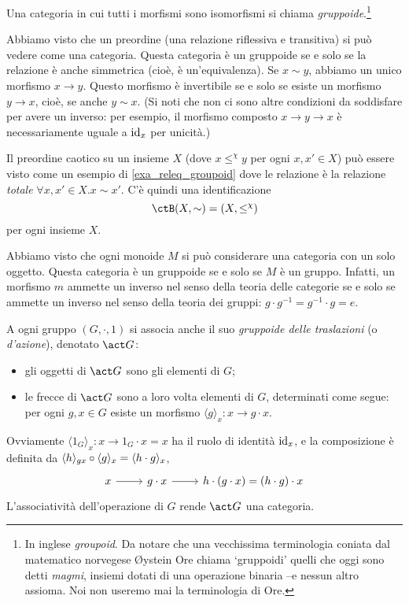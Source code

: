 \begin{definition}[Gruppoide]\label{def_gruppoide}
	Una categoria in cui tutti i morfismi sono isomorfismi si chiama \emph{gruppoide}.\footnote{In inglese \emph{groupoid}. Da notare che una vecchissima terminologia coniata dal matematico norvegese Øystein Ore chiama `gruppoidi' quelli che oggi sono detti \emph{magmi}, insiemi dotati di una operazione binaria --e nessun altro assioma. Noi non useremo mai la terminologia di Ore.}
\end{definition}
\begin{example}\label{exa_releq_groupoid}
	Abbiamo visto che un preordine (una relazione riflessiva e transitiva) si può vedere come una categoria. Questa categoria è un gruppoide se e solo se la relazione è anche simmetrica (cioè, è un'equivalenza). Se \(x\sim y\), abbiamo un unico morfismo \(x\to y\). Questo morfismo è invertibile se e solo se esiste un morfismo \(y\to x\), cioè, se anche \(y\sim x\). (Si noti che non ci sono altre condizioni da soddisfare per avere un inverso: per esempio, il morfismo composto \(x\to y\to x\) è necessariamente uguale a \(\mathrm{id}_x\) per unicità.)
\end{example}
\begin{remark}
	Il preordine caotico su un insieme $X$ (dove \(x\mathrel{\le^\chi} y\) per ogni \(x,x'\in X\)) può essere visto come un esempio di \ref{exa_releq_groupoid} dove le relazione è la relazione \emph{totale} $\forall x,x'\in X.x\sim x'$. C'è quindi una identificazione
	\[\ctB(X,\sim) = (X,\le^\chi)\]
	per ogni insieme $X$.
\end{remark}
\begin{example}\label{exa_grp_groupoid}
	Abbiamo visto che ogni monoide \(M\) si può considerare una categoria con un solo oggetto. Questa categoria è un gruppoide se e solo se \(M\) è un gruppo. Infatti, un morfismo \(m\) ammette un inverso nel senso della teoria delle categorie se e solo se ammette un inverso nel senso della teoria dei gruppi: \(g\cdot g^{-1}=g^{-1}\cdot g = e\).
\end{example}
\begin{example}\label{action_groupoid}
	A ogni gruppo $(G,\cdot,1)$ si associa anche il suo \emph{gruppoide delle traslazioni} (o \emph{d'azione}), denotato $\act G$: 
	\begin{itemize}
		\item gli oggetti di $\act G$ sono gli elementi di $G$;
		\item le frecce di $\act G$ sono a loro volta elementi di $G$, determinati come segue: per ogni $g,x\in G$ esiste un morfismo $\langle g\rangle_x : x\to g\cdot x$.
	\end{itemize}
	Ovviamente $\langle 1_G\rangle_x : x \to 1_G\cdot x=x$ ha il ruolo di identità $\mathrm{id}_x$, e la composizione è definita da $\langle h\rangle_{gx}\circ \langle g\rangle_x = \langle h\cdot g\rangle_x$,
	\[\begin{tikzcd}
		x \ar[r] & g\cdot x \ar[r] & h\cdot (g\cdot x) = (h\cdot g)\cdot x
	\end{tikzcd}\]
	L'associatività dell'operazione di $G$ rende $\act G$ una categoria.
\end{example}
